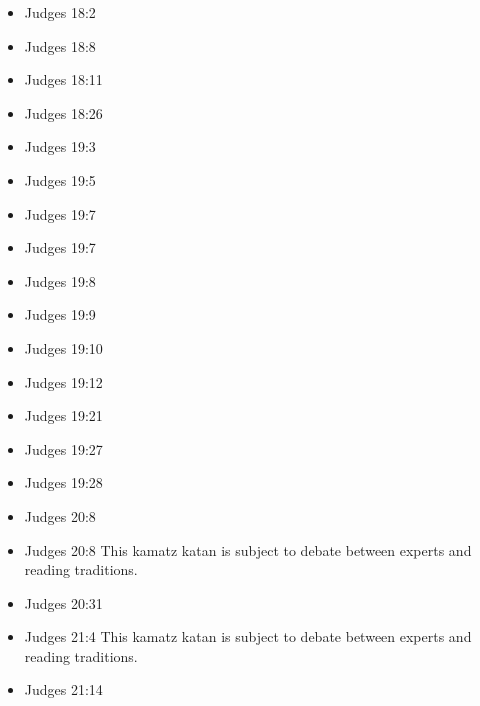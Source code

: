 \documentclass[14pt]{book}
\begin{document}
\begin{multicols}{2}
\begin{itemize}
			\item Judges 18:2
			
			\item Judges 18:8
			
			\item Judges 18:11
			
			\item Judges 18:26
			
			\item Judges 19:3
			
			\item Judges 19:5
			
			\item Judges 19:7
			
			\item Judges 19:7
			
			\item Judges 19:8
			
			\item Judges 19:9
			
			\item Judges 19:10
			
			\item Judges 19:12
			
			\item Judges 19:21
					
			\item Judges 19:27
					
			\item Judges 19:28
					
			\item Judges 20:8
					
			\item Judges 20:8 This kamatz katan is subject to debate between experts and reading traditions.
					
			\item Judges 20:31
					
			\item Judges 21:4 This kamatz katan is subject to debate between experts and reading traditions.
					
			\item Judges 21:14
					
	\end{itemize}\end{multicols}
				
\end{document}
